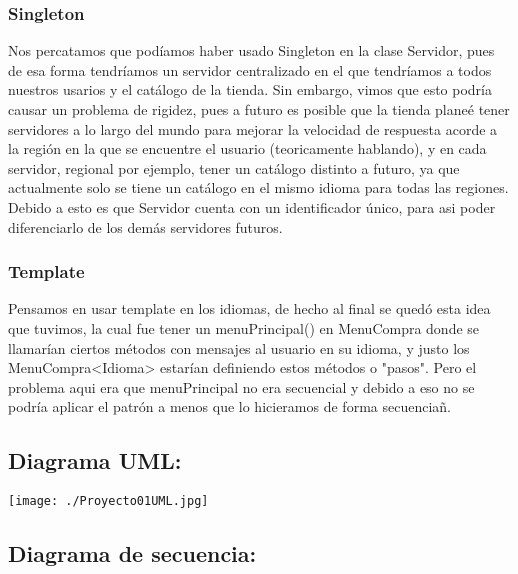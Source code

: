 \documentclass{article}
\begin{document}
\subsubsection*{Singleton}
Nos percatamos que podíamos haber usado Singleton en la clase Servidor, pues de esa forma
tendríamos un servidor centralizado en el que tendríamos a todos nuestros usarios y el catálogo
de la tienda. Sin embargo, vimos que esto podría causar un problema de rigidez, pues a futuro
es posible que la tienda planeé tener servidores a lo largo del mundo para mejorar la velocidad
de respuesta acorde a la región en la que se encuentre el usuario (teoricamente hablando), y
en cada servidor, regional por ejemplo, tener un catálogo distinto a futuro, ya que actualmente
solo se tiene un catálogo en el mismo idioma para todas las regiones. Debido a esto es que
Servidor cuenta con un identificador único, para asi poder diferenciarlo de los demás servidores
futuros.

\subsubsection*{Template}
Pensamos en usar template en los idiomas, de hecho al final se quedó esta idea que tuvimos, la cual fue tener un menuPrincipal() en MenuCompra donde se llamarían ciertos métodos con mensajes al usuario en su idioma, y justo los MenuCompra<Idioma> estarían definiendo estos métodos o "pasos". Pero el problema aqui era que menuPrincipal no era secuencial y debido a eso no se podría aplicar el patrón a menos que lo hicieramos de forma secuenciañ.

\newpage
\subsection*{Diagrama UML:}
\begin{center}
  \texttt{[image: ./Proyecto01UML.jpg]}
\end{center}

\subsection*{Diagrama de secuencia:}
\end{document}
